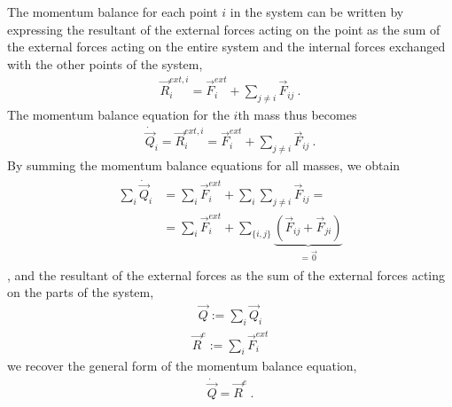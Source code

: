 \documentclass[letterpaper,10pt,english]{jupyterBook}
\begin{document}
\sphinxAtStartPar
{}
The momentum balance for each point \(i\) in the system can be written by expressing the resultant of the external forces acting on the point as the sum of the external forces acting on the entire system and the internal forces exchanged with the other points of the system,
\begin{equation*}
\begin{split}\vec{R}_i^{ext,i} = \vec{F}_i^{ext} + \sum_{j \ne i} \vec{F}_{ij} \ .\end{split}
\end{equation*}
\sphinxAtStartPar
The momentum balance equation for the \(i\)\sphinxhyphen{}th mass thus becomes
\begin{equation*}
\begin{split}\dot{\vec{Q}}_i = \vec{R}_i^{ext,i} = \vec{F}_i^{ext} + \sum_{j \ne i} \vec{F}_{ij} \ .\end{split}
\end{equation*}
\sphinxAtStartPar
By summing the momentum balance equations for all masses, we obtain
\begin{equation*}
\begin{split}\begin{aligned}
\sum_{i} \dot{\vec{Q}}_i & = \sum_i \vec{F}_{i}^{ext} + \sum_i \sum_{j \ne i} \vec{F}_{ij} = \\
                            & = \sum_i \vec{F}_{i}^{ext} + \sum_{\{i,j\}} \underbrace{\left( \vec{F}_{ij} + \vec{F}_{ji} \right)}_{=\vec{0}} 
\end{aligned}\end{split}
\end{equation*}
\sphinxAtStartPar
{}, and the resultant of the external forces as the sum of the external forces acting on the parts of the system,
\begin{equation*}
\begin{split}\vec{Q} := \sum_i \vec{Q}_i\end{split}
\end{equation*}\begin{equation*}
\begin{split}\vec{R}^e := \sum_i \vec{F}_i^{ext}\end{split}
\end{equation*}
\sphinxAtStartPar
we recover the general form of the momentum balance equation,
\begin{equation*}
\begin{split}\dot{\vec{Q}} = \vec{R}^e \ .\end{split}
\end{equation*}
\end{document}
